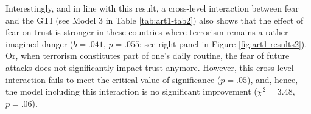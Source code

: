 Interestingly, and in line with this result, a cross-level interaction between fear and the GTI (see Model 3 in Table \ref{tab:art1-tab2}) also shows that the effect of fear on trust is stronger in these countries where terrorism remains a rather imagined danger ($b = .041$, $p = .055$; see right panel in Figure \ref{fig:art1-results2}). Or, when terrorism constitutes part of one’s daily routine, the fear of future attacks does not significantly impact trust anymore. However, this cross-level interaction fails to meet the critical value of significance ($p = .05$), and, hence, the model including this interaction is no significant improvement ($\chi^2 = 3.48$, $p = .06$).


\vspace{3mm}
